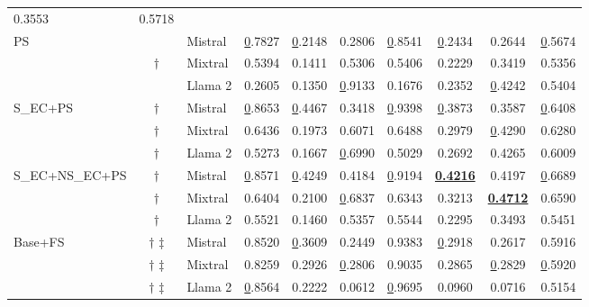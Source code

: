 \begin{table*}[!h]
\begin{tabular}{@{}lclccccccc@{}}
  0.3553 &
  0.5718 \\ \cmidrule(l){3-10}
\multirow{3}{*}{PS} &
  &
  Mistral &
  {\ul 0.7827} &
  {\ul 0.2148} &
  0.2806 &
  {\ul 0.8541} &
  {\ul 0.2434} &
  0.2644 &
  {\ul 0.5674} \\
 &
  $\dagger$ \hspace{0.46em} &
  Mixtral &
  0.5394 &
  0.1411 &
  0.5306 &
  0.5406 &
  0.2229 &
  0.3419 &
  0.5356 \\
 &
  &
  Llama 2 &
  0.2605 &
  0.1350 &
  {\ul 0.9133} &
  0.1676 &
  0.2352 &
  {\ul 0.4242} &
  0.5404 \\ \cmidrule(l){3-10}
\multirow{3}{*}{S\_EC+PS} &
  $\dagger$ \hspace{0.46em} &
  Mistral &
  {\ul 0.8653} &
  {\ul 0.4467} &
  0.3418 &
  {\ul 0.9398} &
  {\ul 0.3873} &
  0.3587 &
  {\ul 0.6408} \\
 &
  $\dagger$ \hspace{0.46em} &
  Mixtral &
  0.6436 &
  0.1973 &
  0.6071 &
  0.6488 &
  0.2979 &
  {\ul 0.4290} &
  0.6280 \\
 &
  $\dagger$ \hspace{0.46em} &
  Llama 2 &
  0.5273 &
  0.1667 &
  {\ul 0.6990} &
  0.5029 &
  0.2692 &
  0.4265 &
  0.6009 \\ \cmidrule(l){3-10}
\multirow{3}{*}{S\_EC+NS\_EC+PS} &
  $\dagger$ \hspace{0.46em} &
  Mistral &
  {\ul 0.8571} &
  {\ul 0.4249} &
  0.4184 &
  {\ul 0.9194} &
  {\ul \textbf{0.4216}} &
  0.4197 &
  {\ul 0.6689} \\
 &
  $\dagger$ \hspace{0.46em} &
  Mixtral &
  0.6404 &
  0.2100 &
  {\ul 0.6837} &
  0.6343 &
  0.3213 &
  {\ul \textbf{0.4712}} &
  0.6590 \\
 &
  $\dagger$ \hspace{0.46em} &
  Llama 2 &
  0.5521 &
  0.1460 &
  0.5357 &
  0.5544 &
  0.2295 &
  0.3493 &
  0.5451 \\ \midrule %
  \midrule
\multirow{3}{*}{Base+FS} &
  $\dagger$ $\ddagger$ &
  Mistral &
  0.8520 &
  {\ul 0.3609} &
  0.2449 &
  0.9383 &
  {\ul 0.2918} &
  0.2617 &
  0.5916 \\
 &
  $\dagger$ $\ddagger$ &
  Mixtral &
  0.8259 &
  0.2926 &
  {\ul 0.2806} &
  0.9035 &
  0.2865 &
  {\ul 0.2829} &
  {\ul 0.5920} \\
 &
  $\dagger$ $\ddagger$ &
  Llama 2 &
  {\ul 0.8564} &
  0.2222 &
  0.0612 &
  {\ul 0.9695} &
  0.0960 &
  0.0716 &
  0.5154 \\ \cmidrule(l){3-10}

\end{tabular}
\end{table*}
